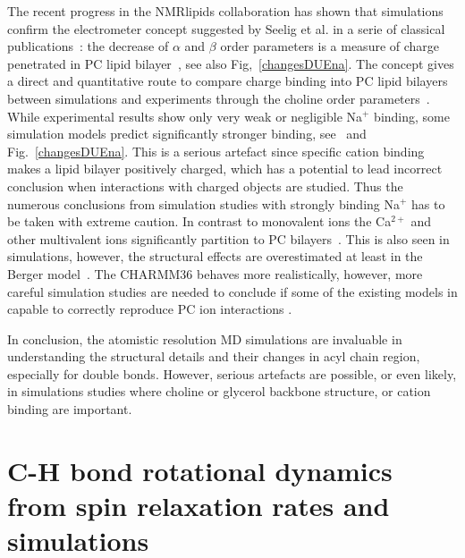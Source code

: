 \documentclass[aps,prl,superscriptaddress,twocolumn]{revtex4}
\begin{document}
The recent progress in the NMRlipids collaboration has shown that simulations confirm the electrometer 
concept suggested by Seelig et al. in a serie of classical publications~\cite{akutsu81,altenbach84,seelig87,scherer89}: 
the decrease of $\alpha$ and $\beta$ order parameters is a measure of 
charge penetrated in PC lipid bilayer~\cite{ionpaper}, see also Fig,~\ref{changesDUEna}. The concept gives a 
direct and quantitative route to compare charge binding into PC lipid bilayers between simulations
and experiments through the choline order parameters~\cite{ionpaper}. While experimental results show 
only very weak or negligible Na$^{+}$ binding, some simulation models predict significantly stronger
binding, see~\cite{ionpaper} and Fig.~\ref{changesDUEna}. This is a serious artefact since specific cation binding 
makes a lipid bilayer positively charged, which has a potential to lead incorrect conclusion when interactions with
charged objects are studied. Thus the numerous conclusions from simulation studies with strongly binding 
Na$^{+}$ has to be taken with extreme caution. In contrast to monovalent ions the Ca$^{2+}$ and other multivalent ions
significantly partition to PC bilayers~\cite{cevc90,akutsu81,altenbach84}. This is also seen in simulations, however, the structural
effects are overestimated at least in the Berger model~\cite{ionpaper}. The CHARMM36 behaves more realistically, 
however, more careful simulation studies are needed to conclude if some of the existing models in capable to correctly
reproduce PC ion interactions \cite{ionpaper}. 

In conclusion, the atomistic resolution MD simulations are invaluable in understanding the 
structural details and their changes in acyl chain region, especially for double bonds.
However, serious artefacts are possible, or even likely, in simulations studies where choline or
glycerol backbone structure, or cation binding are important.


\section{C-H bond rotational dynamics from spin relaxation rates and simulations}\label{dynamicsSECTION}


\end{document}
